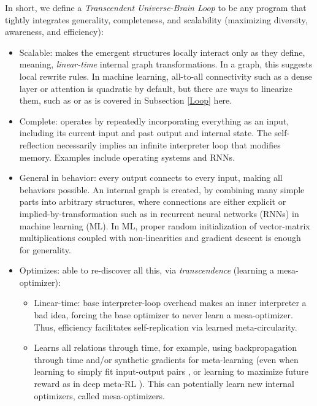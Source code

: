 \documentclass{article}
\begin{document}
In short, we define a \textit{Transcendent Universe-Brain Loop} to be any program that tightly integrates generality, completeness, and scalability (maximizing diversity, awareness, and efficiency):

\begin{itemize}
\item Scalable: makes the emergent structures locally interact only as they define, meaning, \textit{linear-time} internal graph transformations. In a graph, this suggests local rewrite rules. In machine learning, all-to-all connectivity such as a dense layer or attention is quadratic by default, but there are ways to linearize them, such as \cite{schlag2021linear} \cite{tolstikhin2021mlpmixer} or as is covered in Subsection \ref{Loop} here.
\item Complete: operates by repeatedly incorporating everything as an input, including its current input and past output and internal state. The self-reflection necessarily implies an infinite interpreter loop that modifies memory. Examples include operating systems and RNNs.
\item General in behavior: every output connects to every input, making all behaviors possible. An internal graph is created, by combining many simple parts into arbitrary structures, where connections are either explicit or implied-by-transformation such as in recurrent neural networks (RNNs) in machine learning (ML). In ML, proper random initialization of vector-matrix multiplications coupled with non-linearities and gradient descent is enough for generality.
\item Optimizes: able to re-discover all this, via \textit{transcendence} (learning a mesa-optimizer):
\begin{itemize}
\item Linear-time: base interpreter-loop overhead makes an inner interpreter a bad idea, forcing the base optimizer to never learn a mesa-optimizer. Thus, efficiency facilitates self-replication via learned meta-circularity.
\item Learns all relations through time, for example, using backpropagation through time and/or synthetic gradients for meta-learning (even when learning to simply fit input-output pairs \cite{santoro2016oneshot}, or learning to maximize future reward as in deep meta-RL \cite{DBLP:journals/corr/WangKTSLMBKB16}). This can potentially learn new internal optimizers, called mesa-optimizers.

\end{itemize}
\end{itemize}
\end{document}
